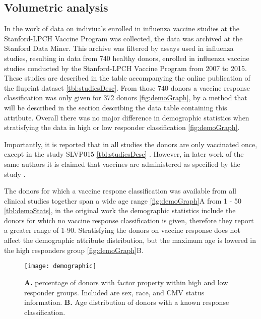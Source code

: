 \subsection{Volumetric analysis}

In the work of \cite{tomicFluPRINTDatasetMultidimensional2019} data on
indiviuals enrolled in influenza vaccine studies at the Stanford-LPCH Vaccine
Program was collected, the data was archived at the Stanford Data Miner. This
archive was filtered by assays used in influenza studies, resulting in data
from 740 healthy donors, enrolled in influenza vaccine studies conducted by the
Stanford-LPCH Vaccine Program from 2007 to 2015. These studies are described in
the table accompanying the online publication of the fluprint dataset
\autoref{tbl:studiesDesc}.  From those 740 donors a vaccine response
classification was only given for 372 donors \autoref{fig:demoGraph}, by a
method that will be described in the section describing the data table
containing this attribute. Overall there was no major difference in demographic
statistics when stratisfying the data in high or low responder classification
\autoref{fig:demoGraph}.

Importantly, it is reported that in all studies the donors are only vaccinated
once, except in the study SLVP015 \autoref{tbl:studiesDesc}
\citep{tomicFluPRINTDatasetMultidimensional2019}. However, in later work of the
same authors it is claimed that vaccines are administered as specified by the study
\citep{tomicSIMONAutomatedMachine2019}.

The donors for which a vaccine respone classification was available from all
clinical studies together span a wide age range \autoref{fig:demoGraph}A from 1
- 50 \autoref{tbl:demoStats}, in the original work the demographic statistics
include the donors for which no vaccine response classification is given,
therefore they report a greater range of 1-90. Stratisfying the donors on
vaccine response does not affect the demographic attribute distribution, but
the maximum age is lowered in the high responders group
\autoref{fig:demoGraph}B.

\begin{figure}[htpb]
    \texttt{[image: demographic]}
    \caption{\textbf{A.} percentage of donors with factor property within high
    and low responder groups. Included are sex, race, and CMV status
    information. \textbf{B.} Age distribution of donors with a known response
    classification.}\label{fig:demoGraph}
\end{figure}



